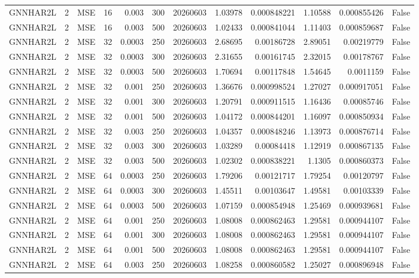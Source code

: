 \begin{tabular}{lrlrrrrrrrrr}
GNNHAR2L & 2 & MSE & 16 & 0.003 & 300 & 20260603 & 1.03978 & 0.000848221 & 1.10588 & 0.000855426 & False \\
GNNHAR2L & 2 & MSE & 16 & 0.003 & 500 & 20260603 & 1.02433 & 0.000841044 & 1.11403 & 0.000859687 & False \\
GNNHAR2L & 2 & MSE & 32 & 0.0003 & 250 & 20260603 & 2.68695 & 0.00186728 & 2.89051 & 0.00219779 & False \\
GNNHAR2L & 2 & MSE & 32 & 0.0003 & 300 & 20260603 & 2.31655 & 0.00161745 & 2.32015 & 0.00178767 & False \\
GNNHAR2L & 2 & MSE & 32 & 0.0003 & 500 & 20260603 & 1.70694 & 0.00117848 & 1.54645 & 0.0011159 & False \\
GNNHAR2L & 2 & MSE & 32 & 0.001 & 250 & 20260603 & 1.36676 & 0.000998524 & 1.27027 & 0.000917051 & False \\
GNNHAR2L & 2 & MSE & 32 & 0.001 & 300 & 20260603 & 1.20791 & 0.000911515 & 1.16436 & 0.00085746 & False \\
GNNHAR2L & 2 & MSE & 32 & 0.001 & 500 & 20260603 & 1.04172 & 0.000844201 & 1.16097 & 0.000850934 & False \\
GNNHAR2L & 2 & MSE & 32 & 0.003 & 250 & 20260603 & 1.04357 & 0.000848246 & 1.13973 & 0.000876714 & False \\
GNNHAR2L & 2 & MSE & 32 & 0.003 & 300 & 20260603 & 1.03289 & 0.00084418 & 1.12919 & 0.000867135 & False \\
GNNHAR2L & 2 & MSE & 32 & 0.003 & 500 & 20260603 & 1.02302 & 0.000838221 & 1.1305 & 0.000860373 & False \\
GNNHAR2L & 2 & MSE & 64 & 0.0003 & 250 & 20260603 & 1.79206 & 0.00121717 & 1.79254 & 0.00120797 & False \\
GNNHAR2L & 2 & MSE & 64 & 0.0003 & 300 & 20260603 & 1.45511 & 0.00103647 & 1.49581 & 0.00103339 & False \\
GNNHAR2L & 2 & MSE & 64 & 0.0003 & 500 & 20260603 & 1.07159 & 0.000854948 & 1.25469 & 0.000939681 & False \\
GNNHAR2L & 2 & MSE & 64 & 0.001 & 250 & 20260603 & 1.08008 & 0.000862463 & 1.29581 & 0.000944107 & False \\
GNNHAR2L & 2 & MSE & 64 & 0.001 & 300 & 20260603 & 1.08008 & 0.000862463 & 1.29581 & 0.000944107 & False \\
GNNHAR2L & 2 & MSE & 64 & 0.001 & 500 & 20260603 & 1.08008 & 0.000862463 & 1.29581 & 0.000944107 & False \\
GNNHAR2L & 2 & MSE & 64 & 0.003 & 250 & 20260603 & 1.08258 & 0.000860582 & 1.25027 & 0.000896948 & False \\

\end{tabular}
